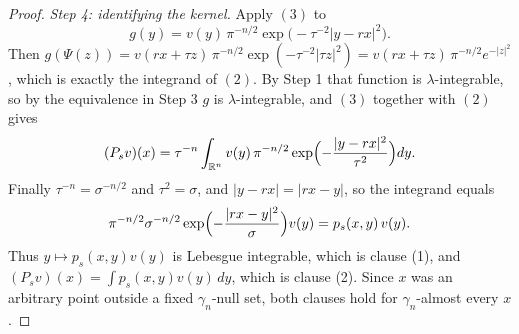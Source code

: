 \begin{proof}
\emph{Step 4: identifying the kernel.}
Apply $(3)$ to
\[
  g(y) = v(y)\,\pi^{-n/2}\exp\bigl(-\tau^{-2}|y - rx|^2\bigr) .
\]
Then $g(\Psi(z)) = v(rx+\tau z)\,\pi^{-n/2}\exp(-\tau^{-2}|\tau z|^2)
 = v(rx+\tau z)\,\pi^{-n/2}e^{-|z|^2}$, which is exactly the integrand of $(2)$.
By Step 1 that function is $\lambda$-integrable, so by the equivalence in Step 3
$g$ is $\lambda$-integrable, and $(3)$ together with $(2)$ gives
\[
  (P_s v)(x)
    = \tau^{-n}\int_{\mathbb{R}^n}
        v(y)\,\pi^{-n/2}\exp\Bigl(-\frac{|y-rx|^2}{\tau^2}\Bigr) dy .
\]
Finally $\tau^{-n} = \sigma^{-n/2}$ and $\tau^2 = \sigma$, and
$|y - rx| = |rx - y|$, so the integrand equals
\[
  \pi^{-n/2}\sigma^{-n/2}\exp\Bigl(-\frac{|rx-y|^2}{\sigma}\Bigr) v(y)
    = p_s(x,y)\,v(y) .
\]
Thus $y \mapsto p_s(x,y)v(y)$ is Lebesgue integrable, which is clause (1), and
$(P_s v)(x) = \int p_s(x,y)v(y)\,dy$, which is clause (2).  Since $x$ was an
arbitrary point outside a fixed $\gamma_n$-null set, both clauses hold for
$\gamma_n$-almost every $x$.
\end{proof}
